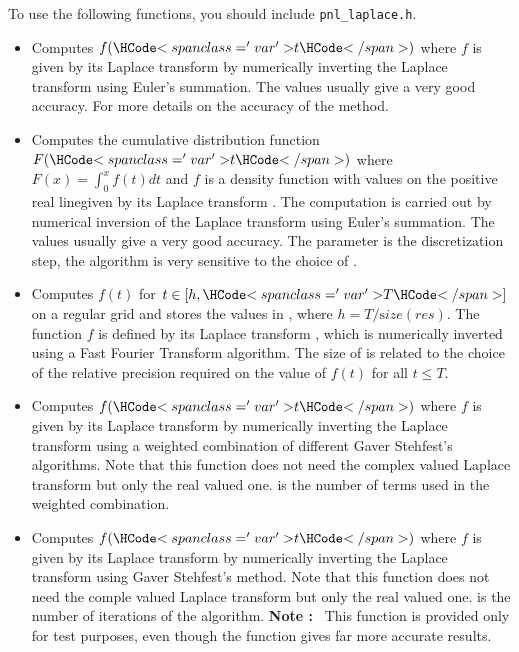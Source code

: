 To use the following functions, you should include \verb!pnl_laplace.h!.

\begin{itemize}
\item {}
  \sshortdescribe Computes $f(\var{t})$ where $f$ is given by its Laplace
  transform  by numerically inverting the Laplace transform using
  Euler's summation. The values  usually give a very good
  accuracy. For more details on the accuracy of the method. 

\item {}
  \sshortdescribe Computes the cumulative distribution function $F(\var{t})$
  where $F(x) = \int_0^x f(t) dt$ and $f$ is a density function with values on
  the positive real linegiven by its Laplace transform . The
  computation is carried out by numerical inversion of the Laplace transform
  using Euler's summation. The values  usually give a very
  good accuracy. The parameter  is the discretization step, the
  algorithm is very sensitive to the choice of .

\item {}
  \sshortdescribe Computes $f(t)$ for $t \in [h, \var{T}]$ on a regular grid
  and stores the values in , where $h = T / {\mathrm size}(res)$. The
  function $f$ is defined by its Laplace transform , which is
  numerically inverted using a Fast Fourier Transform algorithm. The size of
   is related to the choice of the relative precision 
  required on the value of $f(t)$ for all $t \le T$.

\item {}
  \sshortdescribe Computes $f(\var{t})$ where $f$ is given by its Laplace
  transform  by numerically inverting the Laplace transform using a
  weighted combination of different Gaver Stehfest's algorithms. Note that
  this function does not need the complex valued Laplace transform but only the
  real valued one.  is the number of terms used in the weighted combination.

\item {}
  \sshortdescribe Computes $f(\var{t})$ where $f$ is given by its Laplace
  transform  by numerically inverting the Laplace transform using
  Gaver Stehfest's method. Note that this function does not
  need the comple valued Laplace transform but only the real valued
  one.  is the number of iterations of the algorithm.
  {\bf Note : }~This function is provided only for test purposes, even though
  the function  gives far more accurate results.
\end{itemize}

